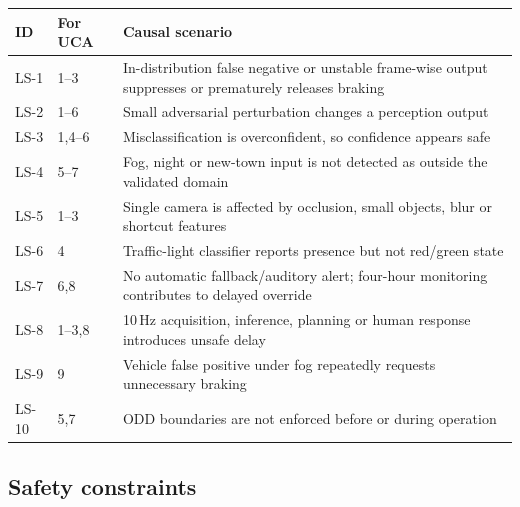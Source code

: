 \documentclass[nologo,a4paper,12pt]{article}
\begin{document}
{\footnotesize
\begin{tabularx}{\linewidth}{@{}p{1.0cm}p{1.8cm}Y@{}}
\toprule
\textbf{ID} & \textbf{For UCA} & \textbf{Causal scenario} \\
\midrule
LS-1 & 1--3 & In-distribution false negative or unstable frame-wise output suppresses or prematurely releases braking \\
LS-2 & 1--6 & Small adversarial perturbation changes a perception output \\
LS-3 & 1,4--6 & Misclassification is overconfident, so confidence appears safe \\
LS-4 & 5--7 & Fog, night or new-town input is not detected as outside the validated domain \\
LS-5 & 1--3 & Single camera is affected by occlusion, small objects, blur or shortcut features \\
LS-6 & 4 & Traffic-light classifier reports presence but not red/green state \\
LS-7 & 6,8 & No automatic fallback/auditory alert; four-hour monitoring contributes to delayed override \\
LS-8 & 1--3,8 & 10\,Hz acquisition, inference, planning or human response introduces unsafe delay \\
LS-9 & 9 & Vehicle false positive under fog repeatedly requests unnecessary braking \\
LS-10 & 5,7 & ODD boundaries are not enforced before or during operation \\
\bottomrule
\end{tabularx}}

\subsection{Safety constraints}
\end{document}
